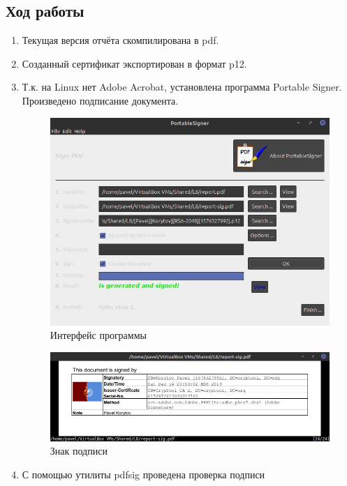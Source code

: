 \documentclass[a4paper, 14pt]{extarticle}
\begin{document}
\subsection{Ход работы}
\begin{enumerate}
    \item Текущая версия отчёта скомпилирована в pdf.
    \item Созданный сертификат экспортирован в формат p12.
    \item Т.к. на Linux нет Adobe Acrobat, установлена программа Portable Signer. Произведено подписание документа.
    \begin{figure}[h]
        \centering
        \includegraphics[width=\textwidth]{img/S020.jpg}
        \caption{Интерфейс программы}%
    \end{figure}
    \begin{figure}[h]
        \centering
        \includegraphics[width=\textwidth]{img/S021.jpg}
        \caption{Знак подписи}%
    \end{figure}
    \item С помощью утилиты pdfsig проведена проверка подписи
    \begin{figure}[h]
        \centering

\end{figure}
\end{enumerate}
\end{document}
